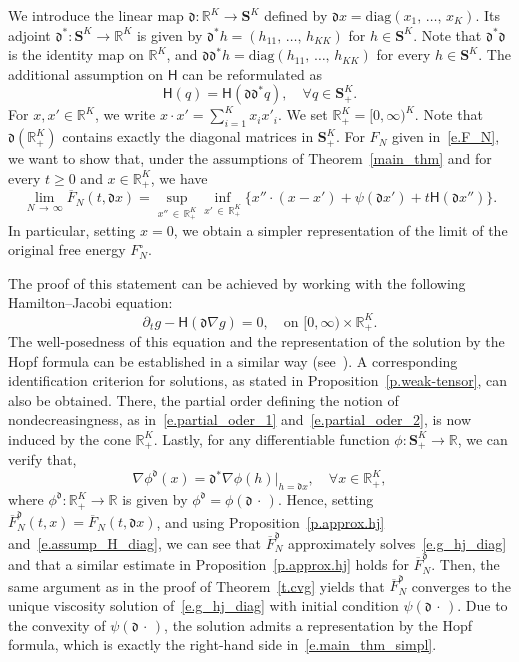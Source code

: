\documentclass[10pt]{amsart}
\theoremstyle{definition}\newtheorem{defi}[theo]{Definition}\newtheorem{rema}[theo]{Remark}\newtheorem{exam}[theo]{Example}\newtheorem{exem}[theo]{Example}\newtheorem{nota}[theo]{Notation}
\newcommand{\R}{\mathbb{R}}
\renewcommand{\S}{\mathbf{S}}
\renewcommand{\H}{\mathsf{H}}
\newcommand{\diag}{\mathfrak{d}}
\newcommand{\diagl}{\mathrm{diag}}
\renewcommand{\ge}{\geqslant}
\renewcommand{\bar}{\overline}
\newcommand{\Ll}{\left}
\newcommand{\Rr}{\right}
\let\oldforall\forall
\renewcommand*{\forall}{\mathrel{\oldforall}}
\begin{document}
We introduce the linear map $\diag : \R^K\to \S^K$ defined by $\diag x = \diagl(x_1,\,\dots,\,x_K)$. Its adjoint $\diag^*:\S^K\to\R^K$ is given by $\diag^* h = (h_{11},\,\dots,\,h_{KK})$ for $h\in \S^K$. Note that $\diag^*\diag$ is the identity map on $\R^K$, and $\diag\diag^*h = \diagl(h_{11},\,\ldots,\,h_{KK})$ for every $h\in \S^K$. The additional assumption on $\H$ can be reformulated as
\begin{equation}\label{e.assump_H_diag}
\H(q) = \H\Ll(\diag\diag^*q\Rr),\quad\forall q\in \S^K_+.
\end{equation}
For $x,x'\in\R^K$, we write $x\cdot x' = \sum_{i=1}^Kx_ix'_i$. We set $\R_+^K= [0,\infty)^K$. Note that $\diag (\R^K_+)$ contains exactly the diagonal matrices in $\S^K_+$. For $F_N$ given in~\eqref{e.F_N}, we want to show that, under the assumptions of Theorem~\ref{main_thm} and for every $t \ge 0$ and $ x \in \R_+^K$, we have
\begin{equation}\label{e.main_thm_simpl}
\lim_{N\,\to\,\infty}\bar F_N(t,\diag x) = \sup_{x''\,\in\,\R^K_+}\inf_{x'\,\in\,\R^K_+}\big\{x''\cdot \left(x-x'\right)+\psi\left(\diag x'\right)+t\H\left(\diag x''\right)\big\}.
\end{equation}
In particular, setting $x=0$, we obtain a simpler representation of the limit of the original free energy $F^\circ_N$.

The proof of this statement can be achieved by working with the following Hamil\-ton--Jacobi equation:
\begin{equation}\label{e.g_hj_diag}
\partial_t g - \H(\diag \nabla g) =0,\quad \text{on }[0,\infty)\times\R^K_+.
\end{equation}
The well-posedness of this equation and the representation of the solution by the Hopf formula can be established in a similar way (see~\cite[Section~2]{chen2022hamilton}). A corresponding identification criterion for solutions, as stated in Proposition~\ref{p.weak-tensor}, can also be obtained. There, the partial order defining the notion of nondecreasingness, as in~\eqref{e.partial_oder_1} and~\eqref{e.partial_oder_2}, is now induced by the cone $\R^K_+$. Lastly, for any differentiable function $\phi:\S^K_+\to\R$, we can verify that,
\[
\nabla \phi^\diag(x) = \diag^* \nabla \phi(h)\big|_{h = \diag x},\quad\forall x \in \R^K_+,
\]
where $\phi^\diag:\R^K_+\to\R$ is given by $\phi^\diag = \phi(\diag\,\cdot\,)$. Hence, setting $\bar F^\diag_N(t,x) = \bar F_N(t,\diag x)$, and using Proposition~\ref{p.approx.hj} and~\eqref{e.assump_H_diag}, we can see that $\bar F^\diag_N$ approximately solves~\eqref{e.g_hj_diag} and that a similar estimate in Proposition~\ref{p.approx.hj} holds for $\bar F^\diag_N$. Then, the same argument as in the proof of Theorem~\ref{t.cvg} yields that $\bar F^\diag_N$ converges to the unique viscosity solution of~\eqref{e.g_hj_diag} with initial condition $\psi(\diag\,\cdot\,)$. Due to the convexity of $\psi(\diag\,\cdot\,)$, the solution admits a representation by the Hopf formula, which is exactly the right-hand side in~\eqref{e.main_thm_simpl}.
\end{document}
